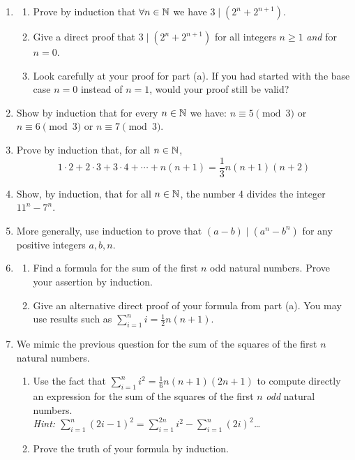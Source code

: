 \begin{exercises}{}{}
\begin{enumerate}
  \item\begin{enumerate}
    \item Prove by induction that $\forall n\in\mathbb{N}$ we have $3\mid(2^n+2^{n+1})$.
    \item Give a direct proof that $3\mid(2^n+2^{n+1})$ for all integers $n\ge 1$ \emph{and} for $n=0$.
    \item Look carefully at your proof for part (a). If you had started with the base case $n=0$ instead of $n=1$, would your proof still be valid?
  \end{enumerate}
  
	\item Show by induction that for every $n\in\mathbb{N}$ we have: $n\equiv 5\pmod 3$ or $n\equiv 6\pmod 3$ or $n\equiv 7\pmod 3$.
	
	\item Prove by induction that, for all $n\in\mathbb{N}$,
	\[
		1\cdot 2+2\cdot 3+3\cdot 4+\cdots +n(n+1)=\frac 13n(n+1)(n+2)
	\]

	\item Show, by induction, that for all $n\in\mathbb{N}$, the number 4 divides the integer $11^n-7^n$.
	
	\item More generally, use induction to prove that $(a-b)\mid (a^n-b^n)$ for any positive integers $a,b,n$.
	
	\item\begin{enumerate}
    \item Find a formula for the sum of the first $n$ odd natural numbers. Prove your assertion by induction.
		\item Give an alternative direct proof of your formula from part (a). You may use results such as $\sum\limits_{i=1}^ni=\frac 12n(n+1)$.
  \end{enumerate}
  
	\item We mimic the previous question for the sum of the squares of the first $n$ natural numbers.
	\begin{enumerate}
    \item Use the fact that $\sum\limits_{i=1}^ni^2=\frac 16n(n+1)(2n+1)$ to compute directly an expression for the sum of the squares of the first $n$ \emph{odd} natural numbers.\\
    \emph{Hint: $\sum\limits_{i=1}^n(2i-1)^2=\sum\limits_{i=1}^{2n}i^2-\sum\limits_{i=1}^n(2i)^2$\ldots}
		\item Prove the truth of your formula by induction.
  \end{enumerate}
  

\end{enumerate}
\end{exercises}
